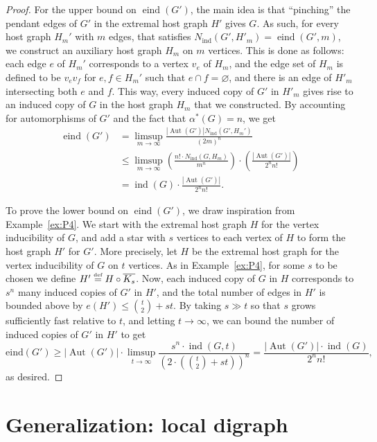 \documentclass[reqno,11pt]{amsart}
\numberwithin{equation}{section}
\theoremstyle{definition}
\theoremstyle{remark}
\newcommand{\abs}[1]{\left\lvert#1\right\rvert}
\DeclareMathOperator{\ind}{ind}
\DeclareMathOperator{\eind}{eind}
\DeclareMathOperator{\Aut}{Aut}
\newcommand*{\eqdef}{\stackrel{\mbox{\normalfont\tiny def}}{=}}
\begin{document}
\begin{proof}
    For the upper bound on $\eind(G')$, the main idea is that ``pinching'' the pendant edges of $G'$ in the extremal host graph $H'$ gives $G$. As such, for every host graph $H_m'$ with $m$ edges, that satisfies $N_{\ind}(G',H'_m)=\eind(G',m)$, we construct an auxiliary host graph $H_m$ on $m$ vertices. This is done as follows: each edge $e$ of $H_m'$ corresponds to a vertex $v_e$ of $H_m$, and the edge set of $H_m$ is defined to be $v_ev_f$ for $e,f \in H_m'$ such that $e \cap f = \varnothing$, and there is an edge of $H'_m$ intersecting both $e$ and $f$. This way, every induced copy of $G'$ in $H'_m$ gives rise to an induced copy of $G$ in the host graph $H_m$ that we constructed. By accounting for automorphisms of $G'$ and the fact that $\alpha^*(G) = n$, we get
    \begin{align*}
        \eind(G') &=  \limsup_{m \to \infty}\frac{\abs{\Aut(G')}N_{\ind}(G',H_m')}{(2m)^n}\\
&\leq  \limsup_{m\to\infty}\left(\frac{n!\cdot N_{\ind}(G,H_m)}{m^n}\right)\cdot
\left(\frac{\abs{\Aut(G')} }{2^n n!}\right)\\
&=   \ind(G)\cdot \frac{\abs{\Aut(G')}}{2^{n}n!}.
    \end{align*}
    
    To prove the lower bound on $\eind(G')$, we draw inspiration from Example~\ref{ex:P4}. We start with the extremal host graph $H$ for the vertex inducibility of $G$, and add a star with $s$ vertices to each vertex of $H$ to form the host graph $H'$ for $G'$. More precisely, let $H$ be the extremal host graph for the vertex inducibility of $G$ on $t$ vertices. As in Example~\ref{ex:P4}, for some $s$ to be chosen we define $H' \eqdef H \circ \overline{K_s}$. Now, each induced copy of $G$ in $H$ corresponds to $s^{n}$ many induced copies of $G'$ in $H'$, and the total number of edges in $H'$ is bounded above by $e(H') \leq \binom{t}{2} + st$.  By taking $s \gg t$ so that $s$ grows sufficiently fast relative to $t$, and letting $t \to \infty$, we can bound the number of induced copies of $G'$ in $H'$ to get 
    \[ \mathrm{eind}(G') \geq \abs{\Aut(G')} \cdot \limsup_{t \to \infty}\frac{s^{n} \cdot\ind(G,t)}{\left(2 \cdot \left(\binom{t}{2} + st \right) \right)^{n}} = \frac{\abs{\Aut(G')} \cdot \ind(G)}{2^n n!}, \]
    as desired. 
\end{proof}

\section{Generalization: local digraph} \label{section: local digraph}
\end{document}
